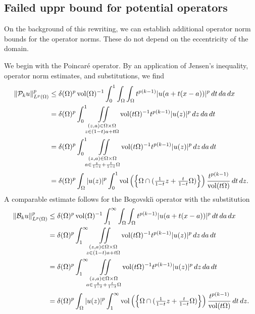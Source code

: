 \documentclass[10pt,a4paper]{article}
\begin{document}
    
    
    

\subsection{Failed uppr bound for potential operators}
On the background of this rewriting, we can establish additional operator norm bounds for the operator norms. 
These do not depend on the eccentricity of the domain. 

We begin with the Poincar\'e operator. 
By an application of Jensen's inequality, operator norm estimates, and substitutions, we find 
\begin{align*}
    \| {\mathcal P}_{k} u \|_{L^{p}(\Omega)}^{p}
    &
    \leq 
    {\delta}(\Omega)^{p}
    \operatorname{vol}(\Omega)^{-1}
    \int_{0}^{1} \int_{\Omega} \int_{\Omega} 
    t^{p(k-1)} |u( a + t(x-a) )|^{p} \,dt \,da \,dx
    \\&
    = 
    {\delta}(\Omega)^{p}
    \int_{0}^{1} 
    \iint\limits_{\substack{ (z,a) \in \Omega \times \Omega \\ z \in (1-t) a + t \Omega } }
    \operatorname{vol}(t\Omega)^{-1}
    t^{p(k-1)} |u( z )|^{p} \,dz \,da \,dt
    \\&
    = 
    {\delta}(\Omega)^{p}
    \int_{0}^{1} 
    \iint\limits_{\substack{ (z,a) \in \Omega \times \Omega \\ a \in \frac{z}{1-t} + \frac{t}{1-t} \Omega } }
    \operatorname{vol}(t\Omega)^{-1}
    t^{p(k-1)} |u( z )|^{p} \,dz \,da \,dt
    \\&
    = 
    {\delta}(\Omega)^{p}
    \int_{\Omega} 
    |u( z )|^{p}
    \int_{0}^{1} 
    \operatorname{vol}\left(\left\{ 
        \Omega \cap ( \tfrac{1}{1-t} z + \tfrac{t}{1-t} \Omega )
    \right\}\right)
    \frac{ t^{p(k-1)} }{ \operatorname{vol}(t\Omega) }
    \,dt \,dz 
    .
\end{align*}
\color{red}
A comparable estimate follows for the Bogovski\u{\i} operator with the substitution 
\begin{align*}
    \| {\mathcal B}_{k} u \|_{L^{p}(\Omega)}^{p}
    &
    \leq 
    {\delta}(\Omega)^{p}
    \operatorname{vol}(\Omega)^{-1}
    \int_{1}^{\infty} \int_{\Omega} \int_{\Omega} 
    t^{p(k-1)} |u( a + t(x-a) )|^{p} \,dt \,da \,dx
    \\&
    = 
    {\delta}(\Omega)^{p}
    \int_{1}^{\infty} 
    \iint\limits_{\substack{ (z,a) \in \Omega \times \Omega \\ z \in (1-t) a + t \Omega } }
    \operatorname{vol}(t\Omega)^{-1}
    t^{p(k-1)} |u( z )|^{p} \,dz \,da \,dt
    \\&
    = 
    {\delta}(\Omega)^{p}
    \int_{1}^{\infty} 
    \iint\limits_{\substack{ (z,a) \in \Omega \times \Omega \\ a \in \frac{z}{1-t} + \frac{t}{1-t} \Omega } }
    \operatorname{vol}(t\Omega)^{-1}
    t^{p(k-1)} |u( z )|^{p} \,dz \,da \,dt
    \\&
    = 
    {\delta}(\Omega)^{p}
    \int_{\Omega} 
    |u( z )|^{p}
    \int_{1}^{\infty} 
    \operatorname{vol}\left(\left\{ 
        \Omega \cap ( \tfrac{1}{1-t} z + \tfrac{t}{1-t} \Omega )
    \right\}\right)
    \frac{ t^{p(k-1)} }{ \operatorname{vol}(t\Omega) }
    \,dt \,dz 
    .
\end{align*}
\end{document}
